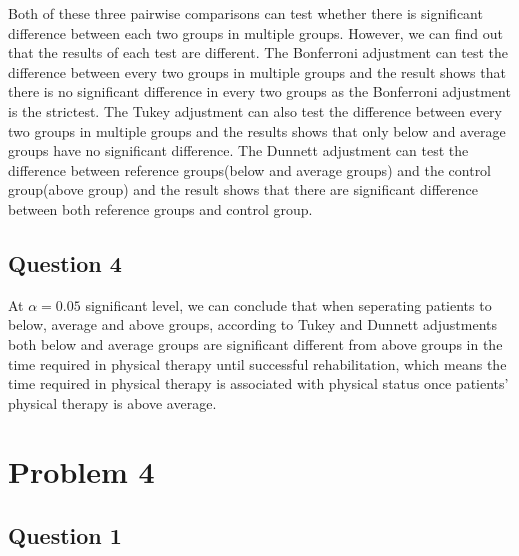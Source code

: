 \documentclass[]{article}
\begin{document}
Both of these three pairwise comparisons can test whether there is
significant difference between each two groups in multiple groups.
However, we can find out that the results of each test are different.
The Bonferroni adjustment can test the difference between every two
groups in multiple groups and the result shows that there is no
significant difference in every two groups as the Bonferroni adjustment
is the strictest. The Tukey adjustment can also test the difference
between every two groups in multiple groups and the results shows that
only below and average groups have no significant difference. The
Dunnett adjustment can test the difference between reference
groups(below and average groups) and the control group(above group) and
the result shows that there are significant difference between both
reference groups and control group.

\subsection{Question 4}\label{question-4-1}

At \(\alpha = 0.05\) significant level, we can conclude that when
seperating patients to below, average and above groups, according to
Tukey and Dunnett adjustments both below and average groups are
significant different from above groups in the time required in physical
therapy until successful rehabilitation, which means the time required
in physical therapy is associated with physical status once patients'
physical therapy is above average.

\section{Problem 4}\label{problem-4}

\subsection{Question 1}\label{question-1-3}
\end{document}
